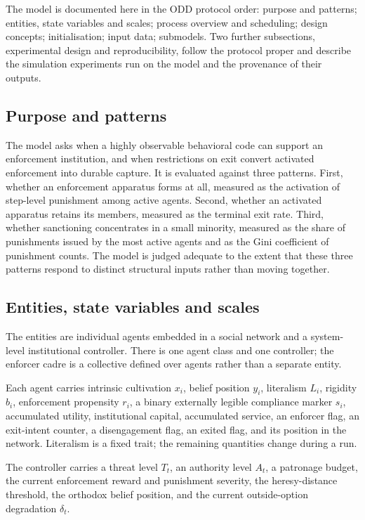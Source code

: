 \documentclass[12pt]{article}
\begin{document}
The model is documented here in the ODD protocol order: purpose and patterns;
entities, state variables and scales; process overview and scheduling; design
concepts; initialisation; input data; submodels. Two further subsections,
experimental design and reproducibility, follow the protocol proper and describe
the simulation experiments run on the model and the provenance of their outputs.

\subsection{Purpose and patterns}

The model asks when a highly observable behavioral code can support an
enforcement institution, and when restrictions on exit convert activated
enforcement into durable capture. It is evaluated against three patterns. First,
whether an enforcement apparatus forms at all, measured as the activation of
step-level punishment among active agents. Second, whether an activated
apparatus retains its members, measured as the terminal exit rate. Third,
whether sanctioning concentrates in a small minority, measured as the share of
punishments issued by the most active agents and as the Gini coefficient of
punishment counts. The model is judged adequate to the extent that these three
patterns respond to distinct structural inputs rather than moving together.

\subsection{Entities, state variables and scales}

The entities are individual agents embedded in a social network and a
system-level institutional controller. There is one agent class and one
controller; the enforcer cadre is a collective defined over agents rather than a
separate entity.

Each agent carries intrinsic cultivation \(x_i\), belief position \(y_i\),
literalism \(L_i\), rigidity \(b_i\), enforcement propensity \(r_i\), a binary
externally legible compliance marker \(s_i\), accumulated utility, institutional
capital, accumulated service, an enforcer flag, an exit-intent counter, a
disengagement flag, an exited flag, and its position in the network. Literalism
is a fixed trait; the remaining quantities change during a run.

The controller carries a threat level \(T_t\), an authority level \(A_t\), a
patronage budget, the current enforcement reward and punishment severity, the
heresy-distance threshold, the orthodox belief position, and the current
outside-option degradation \(\delta_t\).
\end{document}
